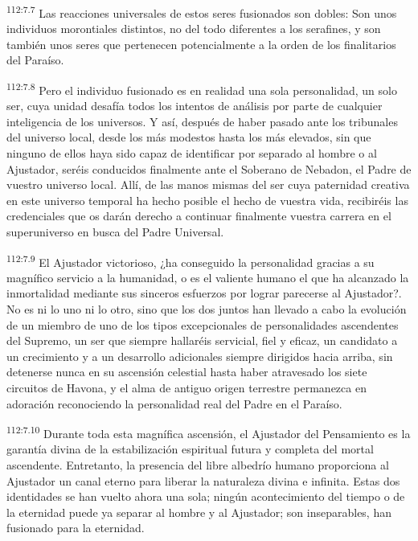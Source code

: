 \documentclass[twoside, 11pt]{book}
\begin{document}
\par
\textsuperscript{112:7.7} Las reacciones universales de estos seres fusionados son dobles: Son unos individuos morontiales distintos, no del todo diferentes a los serafines, y son también unos seres que pertenecen potencialmente a la orden de los finalitarios del Paraíso.

\par
\textsuperscript{112:7.8} Pero el individuo fusionado es en realidad una sola personalidad, un solo ser, cuya unidad desafía todos los intentos de análisis por parte de cualquier inteligencia de los universos. Y así, después de haber pasado ante los tribunales del universo local, desde los más modestos hasta los más elevados, sin que ninguno de ellos haya sido capaz de identificar por separado al hombre o al Ajustador, seréis conducidos finalmente ante el Soberano de Nebadon, el Padre de vuestro universo local. Allí, de las manos mismas del ser cuya paternidad creativa en este universo temporal ha hecho posible el hecho de vuestra vida, recibiréis las credenciales que os darán derecho a continuar finalmente vuestra carrera en el superuniverso en busca del Padre Universal.

\par
\textsuperscript{112:7.9} El Ajustador victorioso, ¿ha conseguido la personalidad gracias a su magnífico servicio a la humanidad, o es el valiente humano el que ha alcanzado la inmortalidad mediante sus sinceros esfuerzos por lograr parecerse al Ajustador?. No es ni lo uno ni lo otro, sino que los dos juntos han llevado a cabo la evolución de un miembro de uno de los tipos excepcionales de personalidades ascendentes del Supremo, un ser que siempre hallaréis servicial, fiel y eficaz, un candidato a un crecimiento y a un desarrollo adicionales siempre dirigidos hacia arriba, sin detenerse nunca en su ascensión celestial hasta haber atravesado los siete circuitos de Havona, y el alma de antiguo origen terrestre permanezca en adoración reconociendo la personalidad real del Padre en el Paraíso.

\par
\textsuperscript{112:7.10} Durante toda esta magnífica ascensión, el Ajustador del Pensamiento es la garantía divina de la estabilización espiritual futura y completa del mortal ascendente. Entretanto, la presencia del libre albedrío humano proporciona al Ajustador un canal eterno para liberar la naturaleza divina e infinita. Estas dos identidades se han vuelto ahora una sola; ningún acontecimiento del tiempo o de la eternidad puede ya separar al hombre y al Ajustador; son inseparables, han fusionado para la eternidad.
\end{document}
